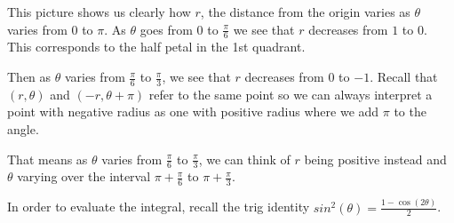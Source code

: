 \documentclass{ximera}
\begin{document}
\begin{exercise}
\begin{hint}
This picture shows us clearly how $r$, the distance from the origin varies as $\theta$ varies from $0$ to $\pi$. As $\theta$ goes from $0$ to $\frac{\pi}{6}$ we see that $r$ decreases from $1$ to $0$. This corresponds to the half petal in the 1st quadrant.

 Then as $\theta$ varies from $\frac{\pi}{6}$ to $\frac{\pi}{3}$, we see that $r$ decreases from $0$ to $-1$. Recall that $(r, \theta)$ and $(-r, \theta + \pi)$ refer to the same point so we can always interpret a point with negative radius as one with positive radius where we add $\pi$ to the angle. 

That means as $\theta$ varies from $\frac{\pi}{6}$ to $\frac{\pi}{3}$, we can think of $r$ being positive instead and $\theta$ varying over the interval $\pi + \frac{\pi}{6}$ to $\pi + \frac{\pi}{3}$. 


In order to evaluate the integral, recall the trig identity $sin^2(\theta)=\frac{1-\cos(2\theta)}{2}$. 










\end{hint}

\end{exercise}
\end{document}
